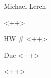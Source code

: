 \documentclass[10pt,letterpaper]{article}
\begin{document}
\hspace{\fill} Michael Lerch

\hspace{\fill} <++>

\hspace{\fill}HW \# <++>

\hspace{\fill} Due <++>

\vspace{1cm}

<++>
\end{document}
